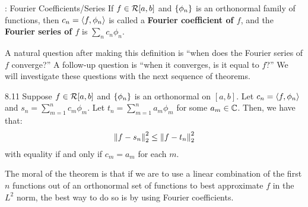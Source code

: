 \begin{ndef}{: Fourier Coefficients/Series}{}
    If $f \in \mathcal{R}[a, b]$ and $\set{\phi_n}$ is an orthonormal family of functions, then $c_n = \langle f, \phi_n \rangle$ is called a \textbf{Fourier coefficient of $f$}, and the \textbf{Fourier series of $f$} is $\sum_n c_n \phi_n$. 
\end{ndef}
\noindent A natural question after making this definition is ``when does the Fourier series of $f$ converge?'' A follow-up question is ``when it converges, is it equal to $f$?'' We will investigate these questions with the next sequence of theorems.

\setcounter{rudin}{10}

\begin{theorem}{}{8.11}
    Suppose $f \in \mathcal{R}[a, b]$ and $\set{\phi_n}$ is an orthonormal on $[a, b]$. Let $c_n = \langle f, \phi_n \rangle$ and $s_n = \sum_{m=1}^n c_m\phi_m$. Let $t_n = \sum_{m=1}^n a_m\phi_m$ for some $a_m \in \mathbb{C}$. Then, we have that:
    \begin{align*}
        \norm{f- s_n}_2^2 \leq \norm{f - t_n}_2^2
    \end{align*}
    with equality if and only if $c_m = a_m$ for each $m$. 
\end{theorem}
\noindent The moral of the theorem is that if we are to use a linear combination of the first $n$ functions out of an orthonormal set of functions to best approximate $f$ in the $L^2$ norm, the best way to do so is by using Fourier coefficients. 

